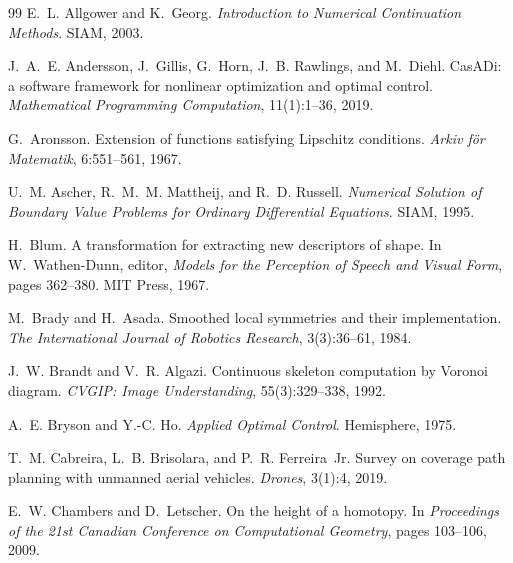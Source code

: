 \documentclass[11pt,a4paper]{article}
\numberwithin{equation}{section}
\theoremstyle{plain}
\theoremstyle{definition}
\theoremstyle{remark}
\begin{document}
\begin{thebibliography}{99}
E.~L. Allgower and K.~Georg.
\newblock \emph{Introduction to Numerical Continuation Methods}.
\newblock SIAM, 2003.

J.~A.~E. Andersson, J.~Gillis, G.~Horn, J.~B. Rawlings, and M.~Diehl.
\newblock CasADi: a software framework for nonlinear optimization and optimal control.
\newblock \emph{Mathematical Programming Computation}, 11(1):1--36, 2019.

G.~Aronsson.
\newblock Extension of functions satisfying Lipschitz conditions.
\newblock \emph{Arkiv f\"or Matematik}, 6:551--561, 1967.

U.~M. Ascher, R.~M.~M. Mattheij, and R.~D. Russell.
\newblock \emph{Numerical Solution of Boundary Value Problems for Ordinary Differential Equations}.
\newblock SIAM, 1995.

H.~Blum.
\newblock A transformation for extracting new descriptors of shape.
\newblock In W.~Wathen-Dunn, editor, \emph{Models for the Perception of Speech and Visual Form}, pages 362--380. MIT Press, 1967.

M.~Brady and H.~Asada.
\newblock Smoothed local symmetries and their implementation.
\newblock \emph{The International Journal of Robotics Research}, 3(3):36--61, 1984.

J.~W. Brandt and V.~R. Algazi.
\newblock Continuous skeleton computation by Voronoi diagram.
\newblock \emph{CVGIP: Image Understanding}, 55(3):329--338, 1992.

A.~E. Bryson and Y.-C. Ho.
\newblock \emph{Applied Optimal Control}.
\newblock Hemisphere, 1975.

T.~M. Cabreira, L.~B. Brisolara, and P.~R. Ferreira~Jr.
\newblock Survey on coverage path planning with unmanned aerial vehicles.
\newblock \emph{Drones}, 3(1):4, 2019.

E.~W. Chambers and D.~Letscher.
\newblock On the height of a homotopy.
\newblock In \emph{Proceedings of the 21st Canadian Conference on Computational Geometry}, pages 103--106, 2009.


\end{thebibliography}
\end{document}
